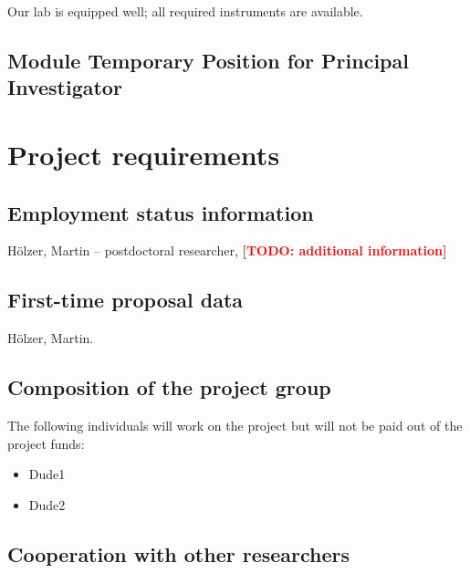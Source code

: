 \documentclass{scrartcl}
\newcommand{\todo}[1]{\xspace{\textcolor{red}{\bfseries[TODO: #1]}}\xspace}
\begin{document}
Our lab is equipped well; all required instruments are available.

\subsection{Module Temporary Position for Principal Investigator}

\section{Project requirements}

\subsection{Employment status information}
H\"olzer, Martin -- postdoctoral researcher, \todo{additional information}

\subsection{First-time proposal data}
H\"olzer, Martin.

\subsection{Composition of the project group}
The following individuals will work on the project but will not be paid out of
the project funds:

\begin{itemize}
\item Dude1
\item Dude2
\end{itemize}

\subsection{Cooperation with other researchers}
\end{document}
